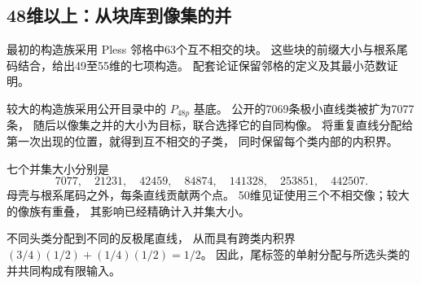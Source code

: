 \subsection{48维以上：从块库到像集的并}

最初的构造族采用 Pless 邻格中63个互不相交的块。
这些块的前缀大小与根系尾码结合，给出49至55维的七项构造。
配套论证保留邻格的定义及其最小范数证明。

较大的构造族采用公开目录中的 $P_{48p}$ 基底。
公开的7069条极小直线类被扩为7077条，
随后以像集之并的大小为目标，联合选择它的自同构像。
将重复直线分配给第一次出现的位置，就得到互不相交的子类，
同时保留每个类内部的内积界。

七个并集大小分别是
\[
7077,\quad21231,\quad42459,\quad84874,\quad141328,\quad253851,\quad442507.
\]
母壳与根系尾码之外，每条直线贡献两个点。
50维见证使用三个不相交像；较大的像族有重叠，
其影响已经精确计入并集大小。

不同头类分配到不同的反极尾直线，
从而具有跨类内积界
$(3/4)(1/2)+(1/4)(1/2)=1/2$。
因此，尾标签的单射分配与所选头类的并共同构成有限输入。
